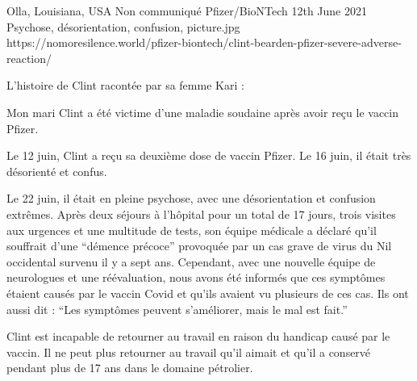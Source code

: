 {Olla, Louisiana, USA}
{Non communiqué}
{Pfizer/BioNTech}
{12th June 2021}
{Psychose, désorientation, confusion, }
{picture.jpg}
{https://nomoresilence.world/pfizer-biontech/clint-bearden-pfizer-severe-adverse-reaction/}
{

L'histoire de Clint racontée par sa femme Kari :

Mon mari Clint a été victime d'une maladie soudaine après avoir reçu le vaccin Pfizer.

Le 12 juin, Clint a reçu sa deuxième dose de vaccin Pfizer. Le 16 juin, il était très désorienté et confus.

Le 22 juin, il était en pleine psychose, avec une désorientation et confusion extrêmes. Après deux séjours à l'hôpital pour un total de 17 jours, trois visites aux urgences et une multitude de tests, son équipe médicale a déclaré qu'il souffrait d'une “démence précoce” provoquée par un cas grave de virus du Nil occidental survenu il y a sept ans. Cependant, avec une nouvelle équipe de neurologues et une réévaluation, nous avons été informés que ces symptômes étaient causés par le vaccin Covid et qu'ils avaient vu plusieurs de ces cas. Ils ont aussi dit : “Les symptômes peuvent s'améliorer, mais le mal est fait.”

Clint est incapable de retourner au travail en raison du handicap causé par le vaccin. Il ne peut plus retourner au travail qu'il aimait et qu'il a conservé pendant plus de 17 ans dans le domaine pétrolier.

}
